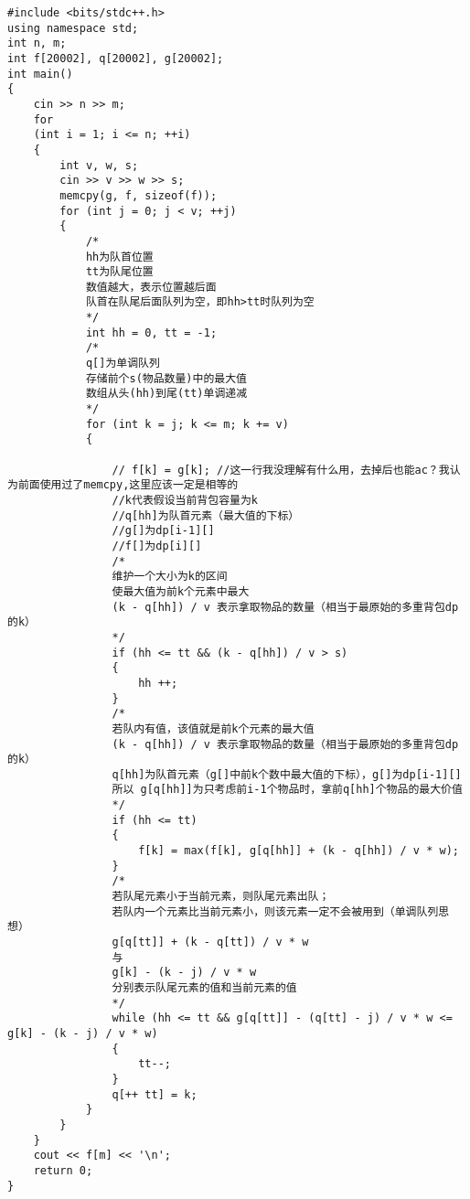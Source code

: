 \documentclass[E:/GsjzTle/main/main.tex]{subfiles}
\begin{document}
\begin{lstlisting}
#include <bits/stdc++.h>
using namespace std;
int n, m;
int f[20002], q[20002], g[20002];
int main()
{
	cin >> n >> m;
	for
	(int i = 1; i <= n; ++i)
	{
		int v, w, s;
		cin >> v >> w >> s;
		memcpy(g, f, sizeof(f));
		for (int j = 0; j < v; ++j)
		{
			/*
			hh为队首位置
			tt为队尾位置
			数值越大，表示位置越后面
			队首在队尾后面队列为空，即hh>tt时队列为空
			*/
			int hh = 0, tt = -1;
			/*
			q[]为单调队列
			存储前个s(物品数量)中的最大值
			数组从头(hh)到尾(tt)单调递减
			*/
			for (int k = j; k <= m; k += v)
			{

				// f[k] = g[k]; //这一行我没理解有什么用，去掉后也能ac？我认为前面使用过了memcpy,这里应该一定是相等的
				//k代表假设当前背包容量为k
				//q[hh]为队首元素（最大值的下标）
				//g[]为dp[i-1][]
				//f[]为dp[i][]
				/*
				维护一个大小为k的区间
				使最大值为前k个元素中最大
				(k - q[hh]) / v 表示拿取物品的数量（相当于最原始的多重背包dp的k）
				*/
				if (hh <= tt && (k - q[hh]) / v > s)
				{
					hh ++;
				}
				/*
				若队内有值，该值就是前k个元素的最大值
				(k - q[hh]) / v 表示拿取物品的数量（相当于最原始的多重背包dp的k）
				q[hh]为队首元素（g[]中前k个数中最大值的下标），g[]为dp[i-1][]
				所以 g[q[hh]]为只考虑前i-1个物品时，拿前q[hh]个物品的最大价值
				*/
				if (hh <= tt)
				{
					f[k] = max(f[k], g[q[hh]] + (k - q[hh]) / v * w);
				}
				/*
				若队尾元素小于当前元素，则队尾元素出队；
				若队内一个元素比当前元素小，则该元素一定不会被用到（单调队列思想）
				g[q[tt]] + (k - q[tt]) / v * w
				与
				g[k] - (k - j) / v * w
				分别表示队尾元素的值和当前元素的值
				*/
				while (hh <= tt && g[q[tt]] - (q[tt] - j) / v * w <= g[k] - (k - j) / v * w)
				{
					tt--;
				}
				q[++ tt] = k;
			}
		}
	}
	cout << f[m] << '\n';
	return 0;
}
\end{lstlisting}
\end{document}
